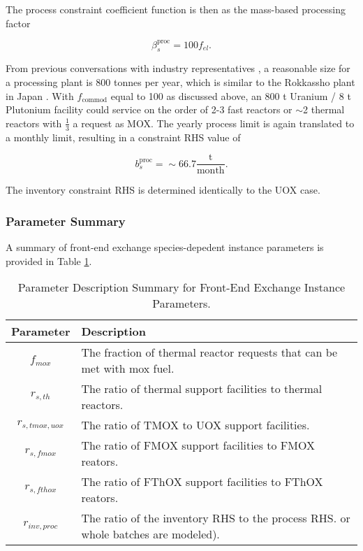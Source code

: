 The process constraint coefficient function is then as the mass-based processing
factor

\begin{equation}
\beta^{\text{proc}}_s = 100 f_{el}. 
\end{equation}

From previous conversations with industry representatives \cite{murraycomm}, a
reasonable size for a processing plant is 800 tonnes per year, which is similar
to the Rokkassho plant in Japan \cite{heinonen2010}. With $f_{\text{commod}}$
equal to 100 as discussed above, an 800 t Uranium / 8 t Plutonium facility could
service on the order of 2-3 fast reactors or $\sim$2 thermal reactors with
$\frac{1}{3}$ a request as MOX. The yearly process limit is again translated to
a monthly limit, resulting in a constraint RHS value of

\begin{equation}
b^{\text{proc}}_s = \sim 66.7 \frac{\text{t}}{\text{month}}.
\end{equation}

The inventory constraint RHS is determined identically to the UOX case.

\subsubsection{Parameter Summary}\label{method:setup:front:sum}

A summary of front-end exchange species-depedent instance parameters is provided
in Table \ref{tbl:front_params}.

\begin{table}[h!]
\centering
\caption{Parameter Description Summary for Front-End Exchange Instance Parameters.}
\label{tbl:front_params}
\begin{tabularx}{\columnwidth-10pt}{|c|X|} %
\hline
Parameter    & 
Description
\\ \hline
$f_{mox}$     & 
The fraction of thermal reactor requests that can be met with mox fuel.
\\ \hline
$r_{s, th}$ & 
The ratio of thermal support facilities to thermal reactors.  
\\ \hline
$r_{s, tmox, uox}$ & 
The ratio of TMOX to UOX support facilities.
\\ \hline
$r_{s, fmox}$ & 
The ratio of FMOX support facilities to FMOX reators.
\\ \hline
$r_{s, fthox}$ & 
The ratio of FThOX support facilities to FThOX reators.
\\ \hline
$r_{inv, proc}$   & 
The ratio of the inventory RHS to the process RHS.
or whole batches are modeled).  
\\ \hline
\end{tabularx}
\end{table}

